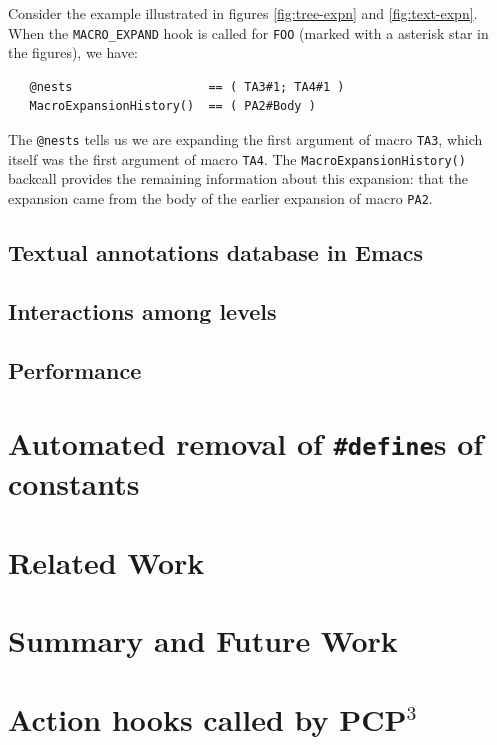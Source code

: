 \documentclass{article}
\newcommand{\pcp}{\mbox{\textsf{PCP}$^3$}}
\newcommand{\ppd}[1]{\texttt{\##1}}
\begin{document}
Consider the example illustrated in figures \ref{fig:tree-expn} and
\ref{fig:text-expn}.  When the \texttt{MACRO\_EXPAND} hook is called for
\texttt{FOO} (marked with a asterisk star in the figures), we have:

\begin{verbatim}
   @nests                   == ( TA3#1; TA4#1 )
   MacroExpansionHistory()  == ( PA2#Body )
\end{verbatim}

\noindent The \texttt{@nests} tells us we are expanding the first
argument of macro \texttt{TA3}, which itself was the first argument of
macro \texttt{TA4}.  The \texttt{MacroExpansionHistory()} backcall
provides the remaining information about this expansion: that the
expansion came from the body of the earlier expansion of macro
\texttt{PA2}.

\subsection{Textual annotations database in Emacs}

\subsection{Interactions among levels}

\subsection{Performance}

\section{Automated removal of \ppd{define}s of constants}
\label{sec:results}

\section{Related Work}
\label{sec:related}

\section{Summary and Future Work}
\label{sec:summary}

\appendix
\newpage

\section{Action hooks called by \pcp}
\begin{footnotesize}
\label{sec:hooks}
\begin{itemize}
\sloppy

\fussy
\end{itemize}
\end{footnotesize}
\end{document}
